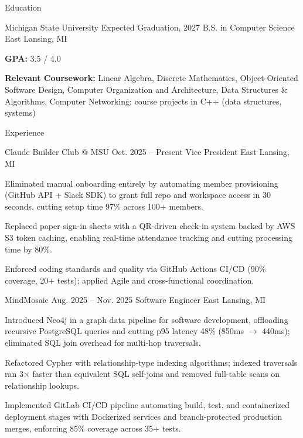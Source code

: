 \documentclass[
	11pt
]{../../../resume}
\begin{document}
	\begin{rSection}{E}{ducation}
		\begin{rSectionEntry}
			{Michigan State University}
			{Expected Graduation, 2027}
			{B.S. in Computer Science}
			{}
			{East Lansing, MI}

			\item \textbf{GPA:} 3.5 / 4.0
			\item \textbf{Relevant Coursework:} Linear Algebra, Discrete Mathematics, Object-Oriented Software Design, Computer Organization and Architecture, Data Structures \& Algorithms, Computer Networking; course projects in C++ (data structures, systems)
		\end{rSectionEntry}
	\end{rSection}

	\begin{rSection}{E}{xperience}
		\begin{rSectionEntry}
			{Claude Builder Club @ MSU}
			{Oct. 2025 -- Present}
			{Vice President}
			{}
			{East Lansing, MI}

			\item Eliminated manual onboarding entirely by automating member provisioning (GitHub API + Slack SDK) to grant full repo and workspace access in 30 seconds, cutting setup time 97\% across 100+ members.
			\item Replaced paper sign-in sheets with a QR-driven check-in system backed by AWS S3 token caching, enabling real-time attendance tracking and cutting processing time by 80\%.
			\item Enforced coding standards and quality via GitHub Actions CI/CD (90\% coverage, 20+ tests); applied Agile and cross-functional coordination.
		\end{rSectionEntry}

		\begin{rSectionEntry}
			{MindMosaic}
			{Aug. 2025 -- Nov. 2025}
			{Software Engineer}
			{}
			{East Lansing, MI}

			\item Introduced Neo4j in a graph data pipeline for software development, offloading recursive PostgreSQL queries and cutting p95 latency 48\% (850ms $\rightarrow$ 440ms); eliminated SQL join overhead for multi-hop traversals.
			\item Refactored Cypher with relationship-type indexing algorithms; indexed traversals ran 3$\times$ faster than equivalent SQL self-joins and removed full-table scans on relationship lookups.
			\item Implemented GitLab CI/CD pipeline automating build, test, and containerized deployment stages with Dockerized services and branch-protected production merges, enforcing 85\% coverage across 35+ tests.
		\end{rSectionEntry}
	\end{rSection}
\end{document}
